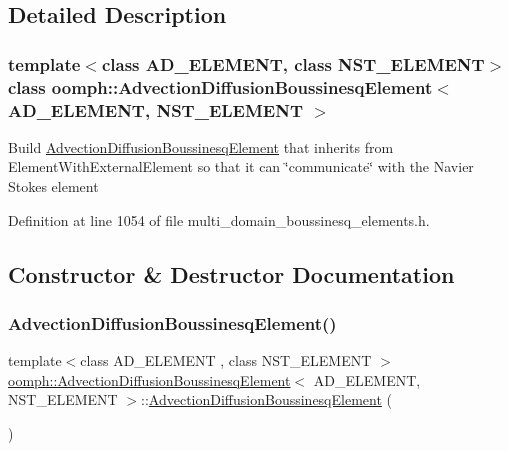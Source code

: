 \subsection{Detailed Description}
\subsubsection*{template$<$class A\+D\+\_\+\+E\+L\+E\+M\+E\+NT, class N\+S\+T\+\_\+\+E\+L\+E\+M\+E\+NT$>$\newline
class oomph\+::\+Advection\+Diffusion\+Boussinesq\+Element$<$ A\+D\+\_\+\+E\+L\+E\+M\+E\+N\+T, N\+S\+T\+\_\+\+E\+L\+E\+M\+E\+N\+T $>$}

Build \hyperlink{classoomph_1_1AdvectionDiffusionBoussinesqElement}{Advection\+Diffusion\+Boussinesq\+Element} that inherits from Element\+With\+External\+Element so that it can \char`\"{}communicate\char`\"{} with the Navier Stokes element 

Definition at line 1054 of file multi\+\_\+domain\+\_\+boussinesq\+\_\+elements.\+h.



\subsection{Constructor \& Destructor Documentation}
\mbox{\label{classoomph_1_1AdvectionDiffusionBoussinesqElement_a733c18518938e3b85e06de5a618cd49f}} 
\subsubsection{\texorpdfstring{Advection\+Diffusion\+Boussinesq\+Element()}{AdvectionDiffusionBoussinesqElement()}}
{\footnotesize\ttfamily template$<$class A\+D\+\_\+\+E\+L\+E\+M\+E\+NT , class N\+S\+T\+\_\+\+E\+L\+E\+M\+E\+NT $>$ \\
\hyperlink{classoomph_1_1AdvectionDiffusionBoussinesqElement}{oomph\+::\+Advection\+Diffusion\+Boussinesq\+Element}$<$ A\+D\+\_\+\+E\+L\+E\+M\+E\+NT, N\+S\+T\+\_\+\+E\+L\+E\+M\+E\+NT $>$\+::\hyperlink{classoomph_1_1AdvectionDiffusionBoussinesqElement}{Advection\+Diffusion\+Boussinesq\+Element} (\begin{DoxyParamCaption}{ }\end{DoxyParamCaption})\hspace{0.3cm}{\ttfamily [inline]}}



